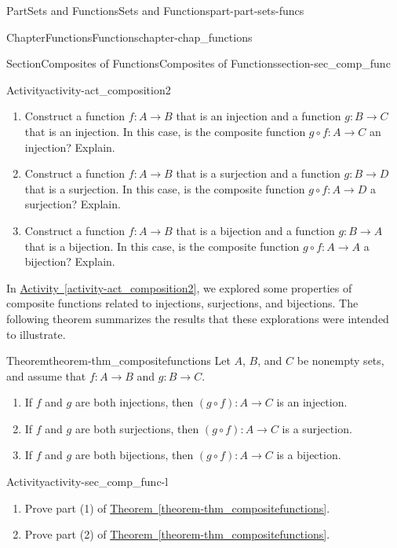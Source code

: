 \documentclass[oneside,10pt,]{book}
\newcommand{\xreffont}{\relax}
\numberwithin{equation}{chapter}
\begin{document}
\begin{partptx}{Part}{Sets and Functions}{}{Sets and Functions}{}{}{part-part-sets-funcs}
\begin{chapterptx}{Chapter}{Functions}{}{Functions}{}{}{chapter-chap_functions}
\begin{sectionptx}{Section}{Composites of Functions}{}{Composites of Functions}{}{}{section-sec_comp_func}
\begin{activity}{Activity}{}{activity-act_composition2}
\begin{equation*}
\end{equation*}
%
\begin{enumerate}[font=\bfseries,label=(\alph*),ref=\alph*]%
\item{}Construct a function \(f : A \to B\) that is an injection and a function \(g : B \to C\) that is an injection. In this case, is the composite function \(g \circ f : A \to C\) an injection? Explain.%
\item{}Construct a function \(f : A \to B\) that is a surjection and a function \(g : B \to D\) that is a surjection. In this case, is the composite function \(g \circ f : A \to D\) a surjection? Explain.%
\item{}Construct a function \(f : A \to B\) that is a bijection and a function \(g : B \to A\) that is a bijection. In this case, is the composite function \(g \circ f : A \to A\) a bijection? Explain.%
\end{enumerate}%
\end{activity}%
In \hyperref[activity-act_composition2]{Activity~{\xreffont\ref{activity-act_composition2}}}, we explored some properties of composite functions related to injections, surjections, and bijections. The following theorem summarizes the results that these explorations were intended to illustrate.%
\begin{theorem}{Theorem}{}{}{theorem-thm_compositefunctions}%
Let \(A\), \(B\), and \(C\) be nonempty sets, and assume that \(f : A \to B\) and \(g : B \to C\).%
\begin{enumerate}
\item\hypertarget{li-thm_compositefunctions1}{}If \(f\) and \(g\) are both injections, then \((g \circ f) : A \to C\) is an injection.%
\item\hypertarget{li-thm_compositefunctions2}{}If \(f\) and \(g\) are both surjections, then \((g \circ f) : A \to C\) is a surjection.%
\item\hypertarget{li-thm_compositefunctions3}{}If \(f\) and \(g\) are both bijections, then \((g \circ f) : A \to C\) is a bijection.%
\end{enumerate}
%
\end{theorem}
\begin{activity}{Activity}{}{activity-sec_comp_func-l}%
\begin{enumerate}[font=\bfseries,label=(\alph*),ref=\alph*]%
\item{}Prove part (1) of \hyperref[theorem-thm_compositefunctions]{Theorem~{\xreffont\ref{theorem-thm_compositefunctions}}}.%
\item{}Prove part (2) of \hyperref[theorem-thm_compositefunctions]{Theorem~{\xreffont\ref{theorem-thm_compositefunctions}}}.%

\end{enumerate}
\end{activity}
\end{sectionptx}
\end{chapterptx}
\end{partptx}
\end{document}
